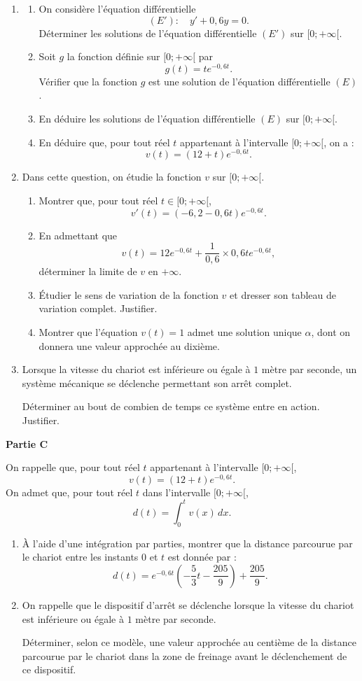 \documentclass[11pt,a4paper]{article}
\newcounter{question}
\begin{document}
\begin{enumerate}
  \item
  \begin{enumerate}
    \item On considère l'équation différentielle
    \[
    (E'):\quad y'+0{,}6y=0.
    \]
    Déterminer les solutions de l'équation différentielle $(E')$ sur $[0;+\infty[$.
    \item Soit $g$ la fonction définie sur $[0;+\infty[$ par
    \[
g(t)=te^{-0{,}6t}.
    \]
    Vérifier que la fonction $g$ est une solution de l'équation différentielle $(E)$.
    \item En déduire les solutions de l'équation différentielle $(E)$ sur $[0;+\infty[$.
    \item En déduire que, pour tout réel $t$ appartenant à l'intervalle $[0;+\infty[$, on a :
    \[
v(t)=(12+t)e^{-0{,}6t}.
    \]
  \end{enumerate}
  \item Dans cette question, on étudie la fonction $v$ sur $[0;+\infty[$.
  \begin{enumerate}
    \item Montrer que, pour tout réel $t\in[0;+\infty[$,
    \[
v'(t)=(-6{,}2-0{,}6t)e^{-0{,}6t}.
    \]
    \item En admettant que
    \[
v(t)=12e^{-0{,}6t}+\dfrac{1}{0{,}6}\times 0{,}6te^{-0{,}6t},
    \]
    déterminer la limite de $v$ en $+\infty$.
    \item Étudier le sens de variation de la fonction $v$ et dresser son tableau de variation complet. Justifier.
    \item Montrer que l'équation $v(t)=1$ admet une solution unique $\alpha$, dont on donnera une valeur approchée au dixième.
  \end{enumerate}
  \item Lorsque la vitesse du chariot est inférieure ou égale à $1$ mètre par seconde, un système mécanique se déclenche permettant son arrêt complet.

  Déterminer au bout de combien de temps ce système entre en action. Justifier.
\end{enumerate}

\textbf{Partie C}

On rappelle que, pour tout réel $t$ appartenant à l'intervalle $[0;+\infty[$,
\[
v(t)=(12+t)e^{-0{,}6t}.
\]
On admet que, pour tout réel $t$ dans l'intervalle $[0;+\infty[$,
\[
d(t)=\int_0^t v(x)\,dx.
\]

\begin{enumerate}
  \item À l'aide d'une intégration par parties, montrer que la distance parcourue par le chariot entre les instants $0$ et $t$ est donnée par :
  \[
d(t)=e^{-0{,}6t}\left(-\dfrac53t-\dfrac{205}{9}\right)+\dfrac{205}{9}.
  \]
  \item On rappelle que le dispositif d'arrêt se déclenche lorsque la vitesse du chariot est inférieure ou égale à $1$ mètre par seconde.

  Déterminer, selon ce modèle, une valeur approchée au centième de la distance parcourue par le chariot dans la zone de freinage avant le déclenchement de ce dispositif.
\end{enumerate}
\end{document}
